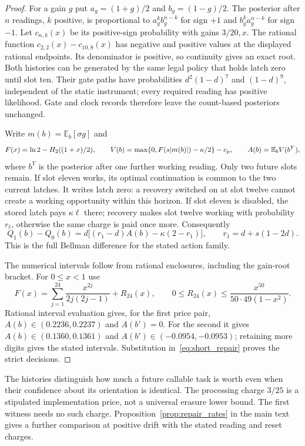 \documentclass[12pt]{article}
\theoremstyle{definition}
\newcommand{\E}{\mathbb E}
\begin{document}
\begin{proof}
For a gain $g$ put $a_g=(1+g)/2$ and $b_g=(1-g)/2$. The posterior after
$n$ readings, $k$ positive, is proportional to
$a_g^kb_g^{n-k}$ for sign $+1$ and $b_g^ka_g^{n-k}$ for sign $-1$.
Let $c_{n,k}(x)$ be its positive-sign probability with gains $3/20,x$.
The rational function $c_{2,2}(x)-c_{10,8}(x)$ has negative and positive
values at the displayed rational endpoints. Its denominator is positive,
so continuity gives an exact root. Both histories can be generated by the
same legal policy that holds latch zero until slot ten. Their gate paths
have probabilities $d^2(1-d)^7$ and $(1-d)^9$, independent of the static
instrument; every required reading has positive likelihood. Gate and
clock records therefore leave the count-based posteriors unchanged.

Write $m(b)=\E_b[\sigma g]$ and
\[
 F(x)=\ln2-H_2((1+x)/2),\qquad
 V(b)=\max\{0,F(s|m(b)|)-\kappa/2\}-c_{\rm p},\qquad
 A(b)=\E_b V(b^Y),
\]
where $b^Y$ is the posterior after one further working reading.
Only two future slots remain. If slot eleven works, its optimal
continuation is common to the two current latches. It writes latch zero:
a recovery switched on at slot twelve cannot create a working opportunity
within this horizon. If slot eleven is disabled, the stored latch pays
$\kappa\ell$ there; recovery makes slot twelve working with probability
$r_\ell$, otherwise the same charge is paid once more. Consequently
\begin{equation}\label{eq:short_repair}
 Q_1(b)-Q_0(b)
 =d\bigl[(r_1-d)A(b)-\kappa(2-r_1)\bigr],\qquad
 r_1=d+s(1-2d).
\end{equation}
This is the full Bellman difference for the stated action family.

The numerical intervals follow from rational enclosures, including the
gain-root bracket. For $0\le x<1$ use
\[
 F(x)=\sum_{j=1}^{24}\frac{x^{2j}}{2j(2j-1)}+R_{24}(x),\qquad
 0\le R_{24}(x)\le\frac{x^{50}}{50\cdot49(1-x^2)}.
\]
Rational interval evaluation gives, for the first price pair,
$A(b)\in(0.2236,0.2237)$ and $A(b')=0$.
For the second it gives $A(b)\in(0.1360,0.1361)$ and
$A(b')\in(-0.0954,-0.0953)$; retaining more digits gives the stated intervals.
Substitution in~\eqref{eq:short_repair} proves the strict decisions.
\end{proof}

The histories distinguish how much a future callable task is worth even
when their confidence about its orientation is identical. The processing
charge $3/25$ is a stipulated implementation price, not a universal
erasure lower bound. The first witness needs no such charge.
Proposition~\ref{prop:repair_rates} in the main text gives a further
comparison at positive drift with the stated reading and reset charges.
\end{document}
